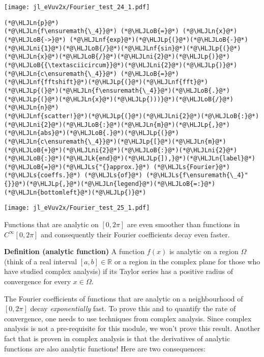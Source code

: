 \documentclass[12pt,a4paper]{article}
\newcommand{\HLJLk}[1]{\textcolor[RGB]{148,91,176}{\textbf{#1}}}
\newcommand{\HLJLn}[1]{#1}
\newcommand{\HLJLnf}[1]{\textcolor[RGB]{66,102,213}{#1}}
\newcommand{\HLJLs}[1]{\textcolor[RGB]{201,61,57}{#1}}
\newcommand{\HLJLni}[1]{\textcolor[RGB]{59,151,46}{#1}}
\newcommand{\HLJLoB}[1]{\textcolor[RGB]{102,102,102}{\textbf{#1}}}
\newcommand{\HLJLp}[1]{#1}
\begin{document}
\texttt{[image: jl\_eVuv2x/Fourier\_test\_24\_1.pdf]}

\begin{lstlisting}
(*@\HLJLn{p}@*)
(*@\HLJLn{f\ensuremath{\_4}}@*) (*@\HLJLoB{=}@*) (*@\HLJLn{x}@*) (*@\HLJLoB{->}@*) (*@\HLJLnf{exp}@*)(*@\HLJLp{(}@*)(*@\HLJLoB{-}@*)(*@\HLJLni{1}@*)(*@\HLJLoB{/}@*)(*@\HLJLnf{sin}@*)(*@\HLJLp{(}@*)(*@\HLJLn{x}@*)(*@\HLJLoB{/}@*)(*@\HLJLni{2}@*)(*@\HLJLp{)}@*)(*@\HLJLoB{{\textasciicircum}}@*)(*@\HLJLni{2}@*)(*@\HLJLp{)}@*)
(*@\HLJLn{c\ensuremath{\_4}}@*) (*@\HLJLoB{=}@*) (*@\HLJLnf{fftshift}@*)(*@\HLJLp{(}@*)(*@\HLJLnf{fft}@*)(*@\HLJLp{(}@*)(*@\HLJLn{f\ensuremath{\_4}}@*)(*@\HLJLoB{.}@*)(*@\HLJLp{(}@*)(*@\HLJLn{x}@*)(*@\HLJLp{)))}@*)(*@\HLJLoB{/}@*)(*@\HLJLn{n}@*)
(*@\HLJLnf{scatter!}@*)(*@\HLJLp{(}@*)(*@\HLJLni{2}@*)(*@\HLJLoB{:}@*)(*@\HLJLni{2}@*)(*@\HLJLoB{:}@*)(*@\HLJLn{m}@*)(*@\HLJLp{,}@*)(*@\HLJLn{abs}@*)(*@\HLJLoB{.}@*)(*@\HLJLp{(}@*)(*@\HLJLn{c\ensuremath{\_4}}@*)(*@\HLJLp{[}@*)(*@\HLJLn{m}@*)(*@\HLJLoB{+}@*)(*@\HLJLni{2}@*)(*@\HLJLoB{:}@*)(*@\HLJLni{2}@*)(*@\HLJLoB{:}@*)(*@\HLJLk{end}@*)(*@\HLJLp{]),}@*)(*@\HLJLn{label}@*)(*@\HLJLoB{=}@*)(*@\HLJLs{"{}approx.}@*) (*@\HLJLs{Fourier}@*) (*@\HLJLs{coeffs.}@*) (*@\HLJLs{of}@*) (*@\HLJLs{f\ensuremath{\_4}"{}}@*)(*@\HLJLp{,}@*)(*@\HLJLn{legend}@*)(*@\HLJLoB{=:}@*)(*@\HLJLn{bottomleft}@*)(*@\HLJLp{)}@*)
\end{lstlisting}

\texttt{[image: jl\_eVuv2x/Fourier\_test\_25\_1.pdf]}

Functions that  are analytic on $[0, 2\pi]$ are even smoother than functions in $C^{\infty}[0, 2\pi]$ and consequently their Fourier coefficients decay even faster.

\textbf{Definition (analytic function)} A function $f(x)$ is analytic on a region $\Omega$ (think of a real interval $[a, b] \in \mathbb{R}$ or a region in the complex plane for those who have studied complex analysis) if its Taylor series has a positive radius of convergence for every $x \in \Omega$.

The Fourier coefficients of functions that are analytic on a neighbourhood of $[0, 2\pi]$ decay \emph{exponentially} fast.  To prove this and to quantify the rate of convergence, one needs to use techniques from complex analysis.  Since complex analysis is not a pre-requisite for this module, we won't prove this result.  Another fact that is proven in complex analysis is that the derivatives of analytic functions are also analytic functions! Here are two consequences:
\end{document}
